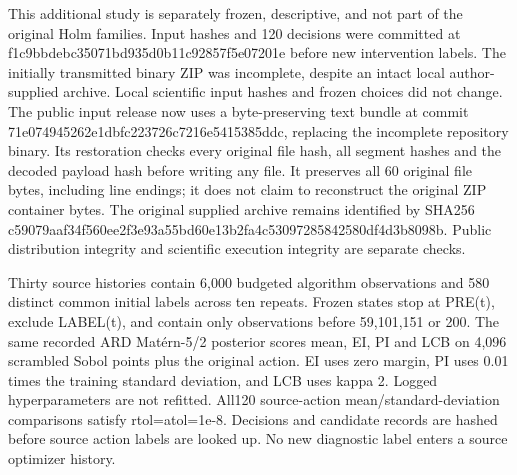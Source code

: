 \documentclass[suppldata]{interact}
\begin{document}
This additional study is separately frozen, descriptive, and not part of the original Holm families. Input hashes and 120 decisions were committed at f1c9bbdebc35071bd935d0b11c92857f5e07201e before new intervention labels. The initially transmitted binary ZIP was incomplete, despite an intact local author-supplied archive. Local scientific input hashes and frozen choices did not change. The public input release now uses a byte-preserving text bundle at commit 71e074945262e1dbfc223726c7216e5415385ddc, replacing the incomplete repository binary. Its restoration checks every original file hash, all segment hashes and the decoded payload hash before writing any file. It preserves all 60 original file bytes, including line endings; it does not claim to reconstruct the original ZIP container bytes. The original supplied archive remains identified by SHA256 c59079aaf34f560ee2f3e93a55bd60e13b2fa4c53097285842580df4d3b8098b. Public distribution integrity and scientific execution integrity are separate checks.

Thirty source histories contain 6,000 budgeted algorithm observations and 580 distinct common initial labels across ten repeats. Frozen states stop at PRE(t), exclude LABEL(t), and contain only observations before 59,101,151 or 200. The same recorded ARD Matérn-5/2 posterior scores mean, EI, PI and LCB on 4,096 scrambled Sobol points plus the original action. EI uses zero margin, PI uses 0.01 times the training standard deviation, and LCB uses kappa 2. Logged hyperparameters are not refitted. All120 source-action mean/standard-deviation comparisons satisfy rtol=atol=1e-8. Decisions and candidate records are hashed before source action labels are looked up. No new diagnostic label enters a source optimizer history.

\FloatBarrier\begingroup\fontsize{8.5}{10.5}\selectfont\setlength\tabcolsep{3pt}
\end{document}
